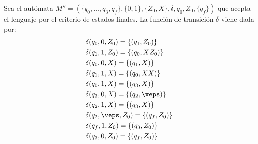 \begin{ejercicio}
\begin{enumerate}
        Sea el autómata $M'' = (\{q_0,\dots,q_3,q_f\},\{0,1\},\{Z_0,X\},\delta,q_0,Z_0,\{q_f\})$ que acepta el lenguaje por el criterio de estados finales. La función de transición $\delta$ viene dada por:
        \begin{align*}
            &\delta(q_0,0,Z_0) = \{(q_1,Z_0)\} \\
            &\delta(q_1,1,Z_0) = \{(q_0,XZ_0)\} \\
            &\delta(q_0,0,X) = \{(q_1,X)\} \\
            &\delta(q_1,1,X) = \{(q_0,XX)\} \\
            &\delta(q_0,1,X) = \{(q_3,X)\} \\
            &\delta(q_3,0,X) = \{(q_2,\veps)\} \\
            &\delta(q_2,1,X) = \{(q_3,X)\} \\
            &\delta(q_2,\veps,Z_0) = \{(q_f,Z_0)\} \\
            &\delta(q_f,1,Z_0) = \{(q_3,Z_0)\}\\
            &\delta(q_3,0,Z_0) = \{(q_f,Z_0)\}
        \end{align*}
    \end{enumerate}
\end{ejercicio}

